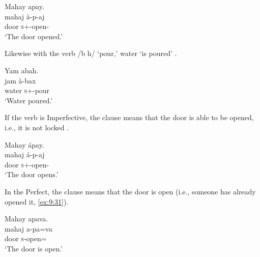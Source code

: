 \ea \label{ex:9:28}
Mahay  apay.\\
\gll  mahaj à-p-aj\\
      door  \textsc{s}+{\PFV}-open{}-{\CL}\\
\glt  ‘The door opened.’
\z

Likewise with the verb /b h/ ‘pour,’ water ‘is poured’ .  

\ea \label{ex:9:29}
Yam  abah.\\
\gll  jam     à-bax\\
      water  \textsc{s}+{\PFV}-pour\\
\glt  ‘Water poured.’
\z

If the verb is Imperfective, the clause means that the door is able to be opened, i.e., it is not locked .

\ea \label{ex:9:30}
Mahay  ápay.\\
\gll  mahaj   á-p-aj\\
      door  \textsc{s}+{\IFV}-open{}-{\CL}\\
\glt  ‘The door opens.’
\z

In the Perfect, the clause means that the door is open (i.e., someone has already opened it, \ref{ex:9:31}).


\ea \label{ex:9:31}
Mahay  apava.\\
\gll  mahaj   a-pa=va\\
      door  \textsc{s}-open={\PRF}\\
\glt  ‘The door is open.’
\z


